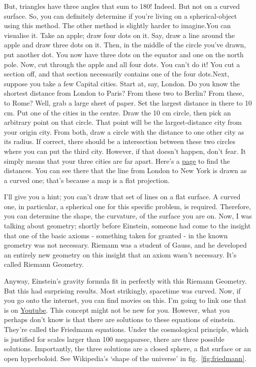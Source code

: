 \begin{multicols}{2}
But, triangles have three angles that sum to 180! Indeed. But not on a curved surface. So, you can definitely determine if you're living on a spherical-object using this method. The other method is slightly harder to imagine.You can visualise it. Take an apple; draw four dots on it. Say, draw a line around the apple and draw three dots on it. Then, in the middle of the circle you've drawn, put another dot. You now have three dots on the equator and one on the north pole. Now, cut through the apple and all four dots. You can't do it! You cut a section off, and that section necessarily contains one of the four dots.Next, suppose you take a few Capital cities. Start at, say, London. Do you know the shortest distance from London to Paris? From these two to Berlin? From these, to Rome? Well, grab a large sheet of paper. Set the largest distance in there to 10 cm. Put one of the cities in the centre. Draw the 10 cm circle, then pick an arbitrary point on that circle. That point will be the largest-distance city from your origin city. From both, draw a circle with the distance to one other city as its radius. If correct, there should be a intersection between these two circles where you can put the third city. However, if that doesn't happen, don't fear. It simply means that your three cities are far apart. Here's a \href{http://www.distancefromto.net/distance-from-new-york-to-london-gb}{page} to find the distances. You can see there that the line from London to New York is drawn as a curved one; that's because a map is a flat projection.

I'll give you a hint; you can't draw that set of lines on a flat surface. A curved one, in particular, a spherical one for this specific problem, is required. Therefore, you can determine the shape, the curvature, of the surface you are on. Now, I was talking about geometry; shortly before Einstein, someone had come to the insight that one of the basic axioms - something taken for granted - in the known geometry was not necessary. Riemann was a student of Gauss, and he developed an entirely new geometry on this insight that an axiom wasn't necessary. It's called Riemann Geometry.


Anyway, Einstein's gravity formula fit in perfectly with this Riemann Geometry. But this had surprising results. Most strikingly, spacetime was curved. Now, if you go onto the internet, you can find movies on this. I'm going to link one that is on \href{https://www.youtube.com/watch?v=MTY1Kje0yLg}{Youtube}. This concept might not be new for you. However, what you perhaps don't know is that there are solutions to these equations of einstein. They're called the Friedmann equations. Under the cosmological principle, which is justified for scales larger than 100 megaparsec, there are three possible solutions. Importantly, the three solutions are a closed sphere, a flat surface or an open hyperboloid. See Wikipedia's ‘shape of the universe’\cite{shape} in fig.~\ref{fig:friedmann}.


\end{multicols}

